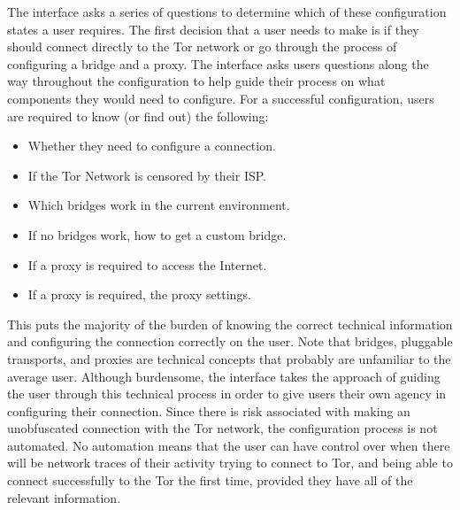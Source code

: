 \documentclass[USenglish,oneside,twocolumn]{article}
\begin{document}
The interface asks a series of questions to determine which of these configuration states a user requires. The first decision that a user needs to make is if they should connect directly to the Tor network or go through the process of  configuring a bridge and a proxy. The interface asks users questions along the way throughout the configuration to help guide their process on what components they would need to configure. For a successful configuration, users are required to know (or find out) the following:\\

\begin{itemize}
	\item{Whether they need to configure a connection.} 
	\item{If the Tor Network is censored by their ISP.}
	\item{Which bridges work in the current environment.} 
	\item{If no bridges work, how to get a custom bridge.} 
	\item{If a proxy is required to access the Internet.}
	\item{If a proxy is required, the proxy settings.}
\end{itemize}

This puts the majority of the burden of knowing the correct technical information and configuring the connection correctly on the user. Note that bridges, pluggable transports, and proxies are technical concepts that probably are unfamiliar to the average user. Although burdensome, the interface takes the approach of guiding the user through this technical process in order to give users their own agency in configuring their connection. Since there is risk associated with making an unobfuscated connection with the Tor network, the configuration process is not automated. No automation means that the user can have control over when there will be network traces of their activity trying to connect to Tor, and being able to connect successfully to the Tor the first time, provided they have all of the relevant information. 
\end{document}
